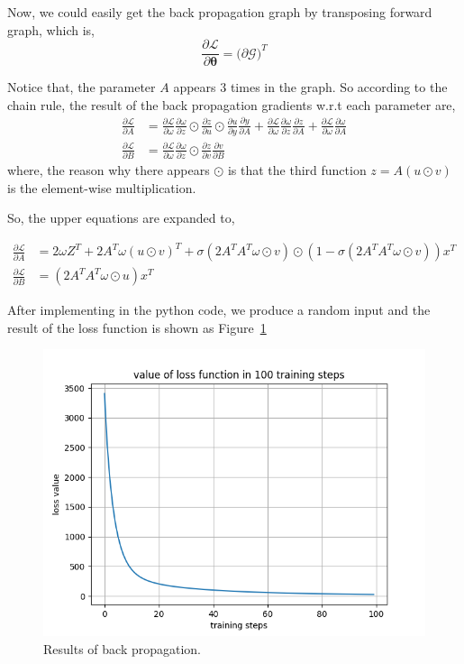 \documentclass[12pt,letterpaper]{article}
\begin{document}
Now, we could easily get the back propagation graph by transposing forward graph, which is,
\begin{equation*}
    \frac{\partial \mathcal{L}}{\partial \boldsymbol{\theta}} = \big( \partial \mathcal{G} \big)^T
\end{equation*}

Notice that, the parameter $A$ appears $3$ times in the graph. So according to the chain rule, the result of the back propagation gradients w.r.t each parameter are,
\begin{align*}
    \frac{\partial \mathcal{L}}{\partial A} &=  \frac{\partial \mathcal{L}}{\partial \omega} \frac{\partial \omega}{\partial z} \odot \frac{\partial z}{\partial u} \odot \frac{\partial u}{\partial y} \frac{\partial y}{\partial A} + \frac{\partial \mathcal{L}}{\partial \omega} \frac{\partial \omega}{\partial z} \frac{\partial z}{\partial A} + \frac{\partial \mathcal{L}}{\partial \omega} \frac{\partial \omega}{\partial A} \\
    \frac{\partial \mathcal{L}}{\partial B} &= \frac{\partial \mathcal{L}}{\partial \omega} \frac{\partial \omega}{\partial z} \odot \frac{\partial z}{\partial v} \frac{\partial v}{\partial B}
\end{align*}
where, the reason why there appears $\odot$ is that the third function $z = A(u \odot v)$ is the element-wise multiplication.

So, the upper equations are expanded to,

\begin{align*}
    \frac{\partial \mathcal{L}}{\partial A} &= 2\omega Z^T + 2A^T\omega (u \odot v)^T+\sigma(2A^TA^T\omega \odot v)\odot (1 - \sigma(2A^TA^T\omega \odot v))x^T \\
    \frac{\partial \mathcal{L}}{\partial B} &= (2A^TA^T\omega \odot u)x^T
\end{align*}

After implementing in the python code, we produce a random input and the result of the loss function is shown as Figure~\ref{fig:experiment}
\begin{figure}[h]
    \centering
    \includegraphics[width=.6\linewidth]{assignment1_question1.png}
    \caption{\small Results of back propagation.}
    \label{fig:experiment}
\end{figure}
\end{document}
